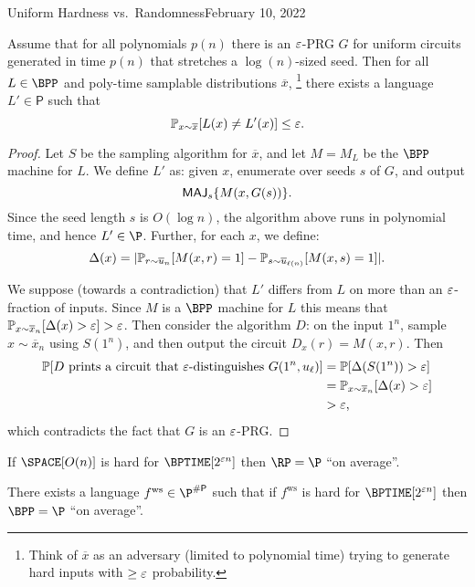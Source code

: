 \begin{lecture}{4}{Uniform Hardness vs.\ Randomness}{February 10, 2022}
\begin{theorem}
  Assume that for all polynomials $p(n)$ there is an $\varepsilon$-PRG $G$ for uniform
  circuits generated in time $p(n)$ that stretches a $\log(n)$-sized seed. Then
  for all $L \in \BPP$ and poly-time samplable distributions $\overline{x}$,%
  \footnote{Think of $\overline{x}$ as an adversary (limited to polynomial
  time) trying to generate hard inputs with $\geq \varepsilon$ probability.} there
  exists a language $L' \in \textsf{P}$ such that
	\[
		\mathbb{P}_{x \sim \overline{x}}[L(x) \neq L'(x)] \leq \varepsilon.
	\]
\end{theorem}

\begin{proof}
	Let $S$ be the sampling algorithm for $\overline{x}$, and let $M = M_L$
	be the $\BPP$ machine for $L$. We define $L'$ as: given $x$, enumerate
	over seeds $s$ of $G$, and output
	\[ \textsf{MAJ}_{s} \{M(x, G(s)) \}. \]
	Since the seed length $s$ is $O(\log n)$, the algorithm above runs in
	polynomial time, and hence $L' \in \P$.
	Further, for each $x$, we define:
	\[
		\Delta(x) = \lvert
			\mathbb{P}_{r \sim \overline{u}_n}         [ M(x, r) = 1]
		  - \mathbb{P}_{s \sim \overline{u}_{\ell(n)}} [ M(x, s) = 1]
		  \rvert.
	\]

	We suppose (towards a contradiction) that $L'$ differs from $L$ on more
	than an $\varepsilon$-fraction of inputs. Since $M$ is a $\BPP$ machine for $L$
	this means that
	$\mathbb{P}_{x \sim \overline{x}_n}[\Delta(x) > \varepsilon] > \varepsilon$. Then consider
	the algorithm $D$: on the input $1^n$, sample $x \sim \overline{x}_n$ using
	$S(1^n)$, and then output the circuit $D_x(r) = M(x, r)$.
	Then
  \begin{align*}
		\mathbb{P}[D \text{ prints a circuit that } \varepsilon \text{-distinguishes } G(1^n, u_{\ell})]
    &= \mathbb{P}[\Delta(S(1^n)) > \varepsilon]\\
    &= \mathbb{P}_{x \sim \overline{x}_n}[\Delta(x) > \varepsilon]\\
    &> \varepsilon,
  \end{align*}
	which contradicts the fact that $G$ is an $\varepsilon$-PRG.
\end{proof}


\begin{theorem}
	If
	$\SPACE\brac{O(n)}$ is hard for $\BPTIME\brac{2^{\eps n}}$
	then
	$\RP = \P$ ``on average''.
\end{theorem}

\newcommand{\fws}{\ensuremath{ f^{\text{ws}} }}
\begin{theorem}
	There exists a language $\fws \in \P^{\sharpp}$ such that if $\fws$
	is hard for $\BPTIME\brac{2^{\eps n}}$ then
	$\BPP = \P$ ``on average''.
\end{theorem}


\end{lecture}
